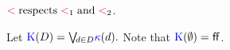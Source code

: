 \begin{figure}
\begin{multicols}{2}
\begin{enumerate}[topsep=0pt,label=(\textsc{i}\arabic*),ref=\textsc{i}\arabic*]
      ${\lt}\rextends{\lt_1}{\lt_2}$.
    \end{enumerate}
  \end{multicols}
  \medskip

  \noindent
  Let 
  \begin{math}
    \kappaE{\bEvs}=
    {\textstyle\bigvee{}\!\!{}_{\bEv\in\bEvs}\labelingForm(\bEv)}.
  \end{math}
  Note that $\kappaE{\emptyset} = \FALSE$.
  \medskip


\end{figure}
